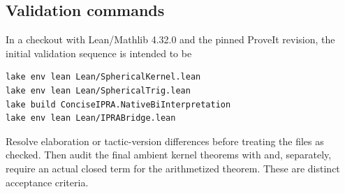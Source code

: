 \subsection{Validation commands}

In a checkout with Lean/Mathlib 4.32.0 and the pinned ProveIt revision, the
initial validation sequence is intended to be
\begin{lstlisting}[language=bash]
lake env lean Lean/SphericalKernel.lean
lake env lean Lean/SphericalTrig.lean
lake build ConciseIPRA.NativeBiInterpretation
lake env lean Lean/IPRABridge.lean
\end{lstlisting}
Resolve elaboration or tactic-version differences before treating the files as
checked.  Then audit the final ambient kernel theorems with 
and, separately, require an actual closed  term for the
arithmetized theorem.  These are distinct acceptance criteria.
